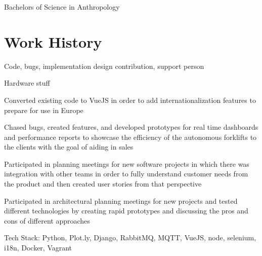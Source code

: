 \documentclass[letterpaper]{resume}
\begin{document}
\begin{compactitem}[\null]
\item Bachelors of Science in Anthropology
\end{compactitem}

\section{Work History}

\begin{compactitem}
\item Code, bugs, implementation design contribution, support person
\item Hardware stuff
\end{compactitem}

\begin{compactitem}
\item Converted existing code to VueJS in order to add internationalization features to prepare for use in Europe
\item Chased bugs, created features, and developed prototypes for real time dashboards and performance reports to showcase the efficiency of the autonomous forklifts to the clients with the goal of aiding in sales
\item Participated in planning meetings for new software projects in which there was integration with other teams in order to fully understand customer needs from the product and then created user stories from that perspective
\item Participated in architectural planning meetings for new projects and tested different technologies by creating rapid prototypes and discussing the pros and cons of different approaches
\item Tech Stack: Python, Plot.ly, Django, RabbitMQ, MQTT, VueJS, node, selenium, i18n, Docker, Vagrant
\end{compactitem}
\end{document}
